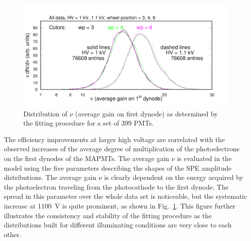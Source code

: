 \begin{figure}[h!]
	\centering
	\includegraphics[width=0.98\linewidth, trim=0 12 50 35,clip]{figures/pglobal_nu.pdf}
	\caption{Distribution of $\nu$ (average gain on first dynode) as determined by the fitting procedure for a set of 399 PMTs.}
	\label{fig:pglobal_nu}
\end{figure}
The efficiency improvements at larger high voltage are correlated with the observed increases of the average degree of multiplication of the photoelectrons on the first dynodes of the MAPMTs. The average gain $\nu$ is evaluated in the model using the five parameters describing the shapes of the SPE amplitude distributions. The average gain $\nu$ is clearly dependent on the energy acquired by the photoelectron traveling from the photocathode to the first dynode. The spread in this parameter over the whole data set is noticeable, but the systematic increase at 1100~V is quite prominent, as shown in Fig.~\ref{fig:pglobal_nu}. This figure further illustrates the consistency and stability of the fitting procedure as the distributions built for different illuminating conditions are very close to each other.


